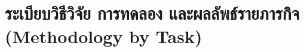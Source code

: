 \documentclass[a4paper,12pt]{article}
\begin{document}


\clearpage
\section{ระเบียบวิธีวิจัย การทดลอง และผลลัพธ์รายภารกิจ (Methodology by Task)}
\label{sec:methodology}












\end{document}
